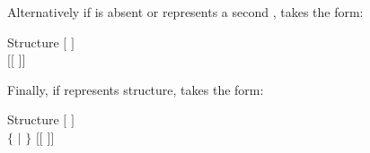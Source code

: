 \noindent
Alternatively if  is absent or represents a second ,
 takes the form:

\begin{DataStructure}{Structure }
$[$   $]$ \\
 $[[$  $]]$ 
\end{DataStructure}

\noindent
Finally, if  represents  structure,  takes
the form:

\begin{DataStructure}{Structure }
$[$   $]$ \\
 $\{$  $|$  $\}$
$[[$  $]]$ 
\end{DataStructure}


